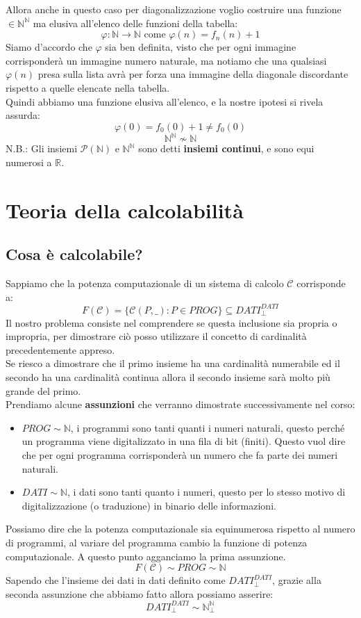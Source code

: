 \documentclass{article}
\begin{document}
Allora anche in questo caso per diagonalizzazione voglio costruire una funzione $\in\mathbb{N}^{\mathbb{N}}$ ma
elusiva all'elenco delle funzioni della tabella:
$$\varphi:\mathbb{N}\rightarrow\mathbb{N}\text{ come }\varphi(n)=f_n(n)+1$$
Siamo d'accordo che $\varphi$ sia ben definita, visto che per ogni immagine corrisponderà un immagine numero naturale,
ma notiamo che una qualsiasi $\varphi(n)$ presa sulla lista avrà per forza una immagine della diagonale discordante
rispetto a quelle elencate nella tabella.\\ Quindi abbiamo una funzione elusiva all'elenco, e la nostre ipotesi si rivela assurda:
$$\varphi(0)=f_0(0)+1\neq f_0(0)$$
$$\mathbb{N}^{\mathbb{N}}\nsim\mathbb{N}$$
N.B.: Gli insiemi $\mathcal{P}(\mathbb{N})$ e $\mathbb{N}^{\mathbb{N}}$ sono detti \textbf{insiemi continui},
e sono equi numerosi a $\mathbb{R}$.

\section{Teoria della calcolabilità}
\subsection{Cosa è calcolabile?}
Sappiamo che la potenza computazionale di un sistema di calcolo $\mathcal{C}$ corrisponde a:
$$F(\mathcal{C})=\{\mathcal{C}(P,\_):P\in PROG\}\subseteq DATI_{\bot}^{DATI}$$
Il nostro problema consiste nel comprendere se questa inclusione sia propria o impropria,
per dimostrare ciò posso utilizzare il concetto di cardinalità precedentemente appreso.\\
Se riesco a dimostrare che il primo insieme ha una cardinalità numerabile ed il secondo ha
una cardinalità continua allora il secondo insieme sarà molto più grande del primo.\\Prendiamo alcune
\textbf{assunzioni} che verranno dimostrate successivamente nel corso:
\begin{itemize}
    \item $PROG\sim\mathbb{N}$, i programmi sono tanti quanti i numeri naturali, questo
          perché un programma viene digitalizzato in una fila di bit (finiti). Questo vuol dire che per ogni
          programma corrisponderà un numero che fa parte dei numeri naturali.

    \item $DATI\sim\mathbb{N}$, i dati sono tanti quanto i numeri, questo per lo stesso motivo
          di digitalizzazione (o traduzione) in binario delle informazioni.
\end{itemize}
Possiamo dire che la potenza computazionale sia equinumerosa rispetto al numero di programmi,
al variare del programma cambio la funzione di potenza computazionale. A questo punto agganciamo
la prima assunzione.
$$F(\mathcal{C})\sim PROG\sim\mathbb{N}$$
Sapendo che l'insieme dei dati in dati definito come $DATI_{\bot}^{DATI}$, grazie alla
seconda assunzione che abbiamo fatto allora possiamo asserire:
$$DATI_{\bot}^{DATI}\sim\mathbb{N}_{\bot}^{\mathbb{N}}$$
\end{document}
